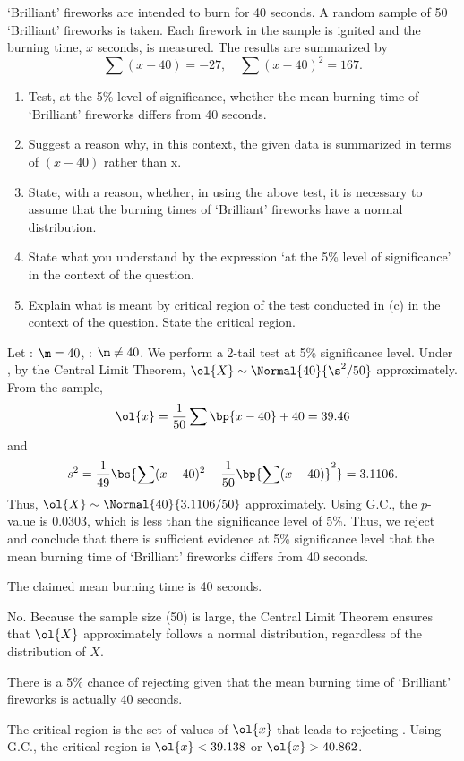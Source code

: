 \begin{problem}
    `Brilliant' fireworks are intended to burn for 40 seconds. A random sample of 50 `Brilliant' fireworks is taken. Each firework in the sample is ignited and the burning time, $x$ seconds, is measured. The results are summarized by \[\sum(x-40)=-27, \quad \sum(x-40)^{2}=167.\]

    \begin{enumerate}
        \item Test, at the 5\% level of significance, whether the mean burning time of `Brilliant' fireworks differs from 40 seconds.
        \item Suggest a reason why, in this context, the given data is summarized in terms of $(x-40)$ rather than x.
        \item State, with a reason, whether, in using the above test, it is necessary to assume that the burning times of `Brilliant' fireworks have a normal distribution.
        \item State what you understand by the expression `at the 5\% level of significance' in the context of the question.
        \item Explain what is meant by critical region of the test conducted in (c) in the context of the question. State the critical region.
    \end{enumerate}
\end{problem}
\begin{solution}
    \begin{ppart}
        Let \nullhyp: $\m = 40$, \althyp: $\m \neq 40$. We perform a 2-tail test at 5\% significance level. Under \nullhyp, by the Central Limit Theorem, $\ol{X} \sim \Normal{40}{\s^2/50}$ approximately. From the sample, \[\ol{x} = \frac1{50} \sum \bp{x - 40} + 40 = 39.46\] and \[s^2 = \frac1{49}\bs{\sum (x-40)^2 - \frac1{50} \bp{\sum (x-40)}^2} = 3.1106.\] Thus, $\ol{X} \sim \Normal{40}{3.1106/50}$ approximately. Using G.C., the $p$-value is 0.0303, which is less than the significance level of 5\%. Thus, we reject \nullhyp{} and conclude that there is sufficient evidence at 5\% significance level that the mean burning time of `Brilliant' fireworks differs from 40 seconds.
    \end{ppart}
    \begin{ppart}
        The claimed mean burning time is 40 seconds.
    \end{ppart}
    \begin{ppart}
        No. Because the sample size (50) is large, the Central Limit Theorem ensures that $\ol{X}$ approximately follows a normal distribution, regardless of the distribution of $X$.
    \end{ppart}
    \begin{ppart}
        There is a 5\% chance of rejecting \nullhyp{} given that the mean burning time of `Brilliant' fireworks is actually 40 seconds.
    \end{ppart}
    \begin{ppart}
        The critical region is the set of values of $\ol{x}$ that leads to rejecting \nullhyp. Using G.C., the critical region is $\ol{x} < 39.138$ or $\ol{x} > 40.862$.
    \end{ppart}
\end{solution}

